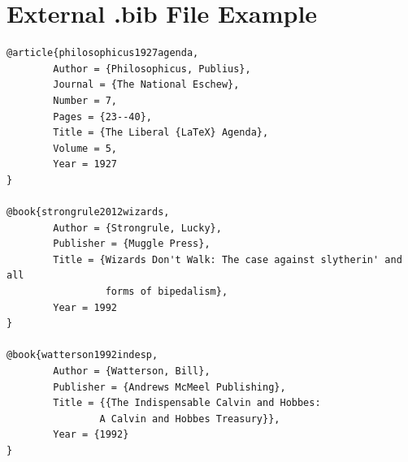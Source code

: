 \documentclass[12pt]{article}
\begin{document}
\section{External .bib File Example}
\footnotesize
\begin{verbatim}
@article{philosophicus1927agenda,
        Author = {Philosophicus, Publius},
        Journal = {The National Eschew},
        Number = 7,
        Pages = {23--40},
        Title = {The Liberal {LaTeX} Agenda},
        Volume = 5,
        Year = 1927
}

@book{strongrule2012wizards,
        Author = {Strongrule, Lucky},
        Publisher = {Muggle Press},
        Title = {Wizards Don't Walk: The case against slytherin' and all
                 forms of bipedalism},
        Year = 1992
}

@book{watterson1992indesp,
        Author = {Watterson, Bill},
        Publisher = {Andrews McMeel Publishing},
        Title = {{The Indispensable Calvin and Hobbes: 
                A Calvin and Hobbes Treasury}},
        Year = {1992}
}
\end{verbatim}
\end{document}
